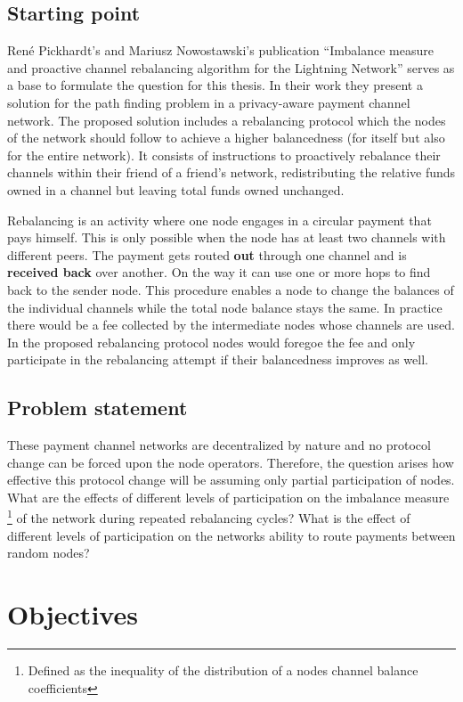 \documentclass[final]{fhnwreport}       %
\begin{document}
\subsection{Starting point}
René Pickhardt's and Mariusz Nowostawski's publication ``Imbalance measure and proactive channel rebalancing algorithm for the Lightning Network'' \cite{pickhardt_imbalance_2019} serves as a base to formulate the question for this thesis. In their work they present a solution for the path finding problem in a privacy-aware payment channel network. The proposed solution includes a rebalancing protocol which the nodes of the network should follow to achieve a higher balancedness (for itself but also for the entire network). It consists of instructions to proactively rebalance their channels within their friend of a friend's network, redistributing the relative funds owned in a channel but leaving total funds owned unchanged.

Rebalancing is an activity where one node engages in a circular payment that pays himself. This is only possible when the node has at least two channels with different peers. The payment gets routed \textbf{out} through one channel and is \textbf{received back} over another. On the way it can use one or more hops to find back to the sender node. This procedure enables a node to change the balances of the individual channels while the total node balance stays the same. In practice there would be a fee collected by the intermediate nodes whose channels are used. In the proposed rebalancing protocol nodes would foregoe the fee and only participate in the rebalancing attempt if their balancedness improves as well.

\subsection{Problem statement}
These payment channel networks are decentralized by nature and no protocol change can be forced upon the node operators. Therefore, the question arises how effective this protocol change will be assuming only partial participation of nodes. What are the effects of different levels of participation on the imbalance measure \footnote{Defined as the inequality of the distribution of a nodes channel balance coefficients} of the network during repeated rebalancing cycles? What is the effect of different levels of participation on the networks ability to route payments between random nodes? 

\section{Objectives}
\end{document}
